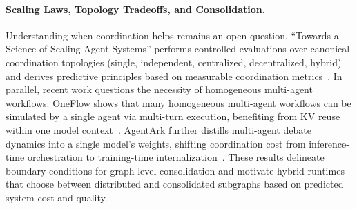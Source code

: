 \paragraph{Scaling Laws, Topology Tradeoffs, and Consolidation.}
Understanding when coordination helps remains an open question. ``Towards a Science of Scaling Agent Systems'' performs controlled evaluations over canonical coordination topologies (single, independent, centralized, decentralized, hybrid) and derives predictive principles based on measurable coordination metrics~\citep{kim2025scalingagents}. In parallel, recent work questions the necessity of homogeneous multi-agent workflows: OneFlow shows that many homogeneous multi-agent workflows can be simulated by a single agent via multi-turn execution, benefiting from KV reuse within one model context~\citep{xu2026oneflow}. AgentArk further distills multi-agent debate dynamics into a single model's weights, shifting coordination cost from inference-time orchestration to training-time internalization~\citep{luo2026agentark}. These results delineate boundary conditions for graph-level consolidation and motivate hybrid runtimes that choose between distributed and consolidated subgraphs based on predicted system cost and quality.
